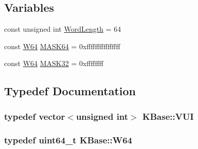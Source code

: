 \subsection*{Variables}
\begin{DoxyCompactItemize}
\item 
const unsigned int \hyperlink{namespace_k_base_a66b407b6bd1ef4be60f9beaf91321774}{Word\-Length} = 64
\item 
const \hyperlink{namespace_k_base_ad560ba73f29a481837375dfda23dca0d}{W64} \hyperlink{namespace_k_base_a2325d5f438383f4f982a23e21ad5c524}{M\-A\-S\-K64} = 0xffffffffffffffff
\item 
const \hyperlink{namespace_k_base_ad560ba73f29a481837375dfda23dca0d}{W64} \hyperlink{namespace_k_base_a656a0fe5ef8ff4cb32763dd983906a66}{M\-A\-S\-K32} = 0xffffffff
\end{DoxyCompactItemize}


\subsection{Typedef Documentation}
\hypertarget{namespace_k_base_ad8d970208cc99c612b207d7bbbad4434}{
\subsubsection[{V\-U\-I}]{\setlength{\rightskip}{0pt plus 5cm}typedef vector$<$unsigned int$>$ {\bf K\-Base\-::\-V\-U\-I}}}\label{namespace_k_base_ad8d970208cc99c612b207d7bbbad4434}
\hypertarget{namespace_k_base_ad560ba73f29a481837375dfda23dca0d}{
\subsubsection[{W64}]{\setlength{\rightskip}{0pt plus 5cm}typedef uint64\-\_\-t {\bf K\-Base\-::\-W64}}}\label{namespace_k_base_ad560ba73f29a481837375dfda23dca0d}


